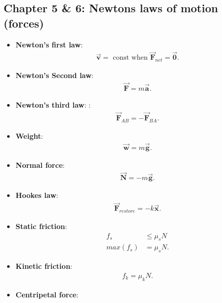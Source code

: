 \documentclass{report}
\begin{document}
    \subsection{Chapter 5 \& 6: Newtons laws of motion (forces)}
    \begin{itemize}
        \item \textbf{Newton's first law}:
            \begin{align*}
                \vec{\mathbf{v}} = \text{ const when } \vec{\mathbf{F}}_{net} = \vec{\mathbf{0}}
            .\end{align*}
        \item \textbf{Newton's Second law}: 
            \begin{align*}
                \vec{\mathbf{F}} = m\vec{\mathbf{a}}
            .\end{align*}
        \item \textbf{Newton's third law}: :
            \begin{align*}
                \vec{\mathbf{F}}_{AB} = -\vec{\mathbf{F}}_{BA}
            .\end{align*}
        \item \textbf{Weight}:
            \begin{align*}
                \vec{\mathbf{w}} = m\vec{\mathbf{g}}
            .\end{align*}
        \item \textbf{Normal force}:
            \begin{align*}
                \vec{\mathbf{N}} = - m\vec{\mathbf{g}}
            .\end{align*}
        \item \textbf{Hookes law}:
            \begin{align*}
                \vec{\mathbf{F}}_{restore} = -k\vec{\mathbf{x}}
            .\end{align*}
        \item \textbf{Static friction}:
            \begin{align*}
                f_{s} &\leq \mu_{s}N \\
                max(f_{s}) &= \mu_{s}N
            .\end{align*}
        \item \textbf{Kinetic friction}:
            \begin{align*}
                f_{k} = \mu_{k}N
            .\end{align*}
        \item \textbf{Centripetal force}:

\end{itemize}
\end{document}
